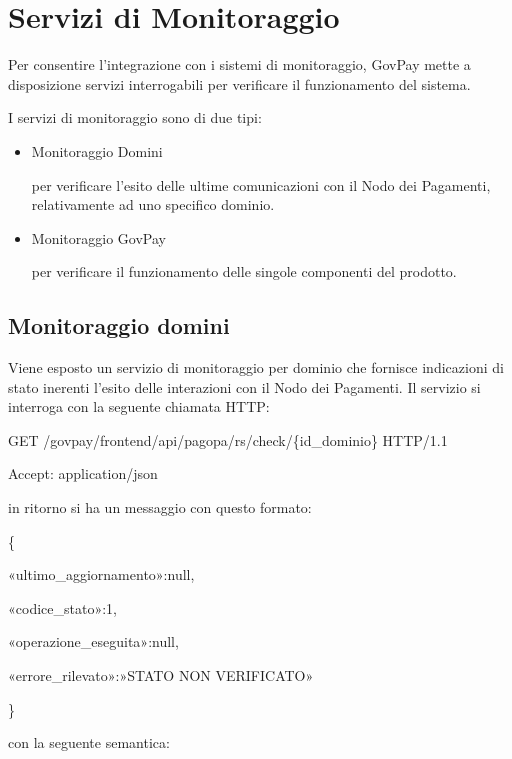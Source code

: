 \documentclass[letterpaper,10pt,italian]{sphinxmanual}
\begin{document}
\chapter{Servizi di Monitoraggio}
\label{\detokenize{monitoraggio/index:servizi-di-monitoraggio}}\label{\detokenize{monitoraggio/index:inst-monitoraggio}}\label{\detokenize{monitoraggio/index::doc}}
Per consentire l’integrazione con i sistemi di monitoraggio, GovPay
mette a disposizione servizi interrogabili per verificare il
funzionamento del sistema.

I servizi di monitoraggio sono di due tipi:
\begin{itemize}
\item {} 
Monitoraggio Domini

per verificare l’esito delle ultime comunicazioni con il Nodo dei
Pagamenti, relativamente ad uno specifico dominio.

\item {} 
Monitoraggio GovPay

per verificare il funzionamento delle singole componenti del
prodotto.

\end{itemize}


\section{Monitoraggio domini}
\label{\detokenize{monitoraggio/index:monitoraggio-domini}}
Viene esposto un servizio di monitoraggio per dominio che fornisce
indicazioni di stato inerenti l’esito delle interazioni con il Nodo dei
Pagamenti. Il servizio si interroga con la seguente chiamata HTTP:

GET /govpay/frontend/api/pagopa/rs/check/\{id\_dominio\} HTTP/1.1

Accept: application/json

in ritorno si ha un messaggio con questo formato:

\{

«ultimo\_aggiornamento»:null,

«codice\_stato»:1,

«operazione\_eseguita»:null,

«errore\_rilevato»:»STATO NON VERIFICATO»

\}

con la seguente semantica:
\end{document}
